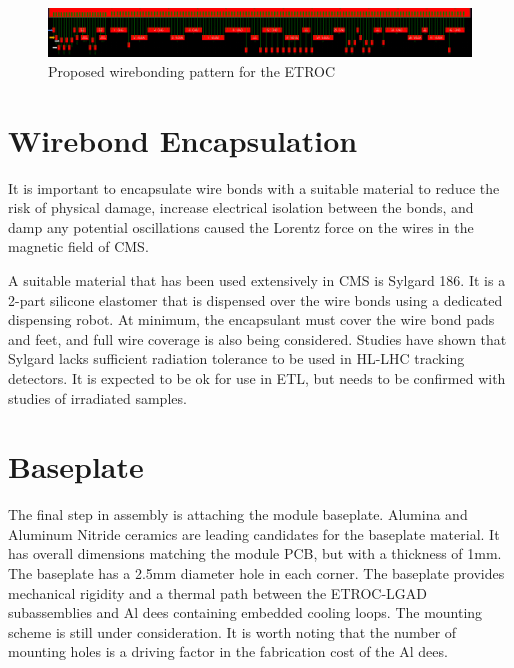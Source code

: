 \documentclass[10pt]{datasheet}
\begin{document}
\begin{figure}[h]
	\centering
	\includegraphics[width=\textwidth]{figures/wirebonding-pattern.png}
	\caption{Proposed wirebonding pattern for the ETROC}
	\label{fig:wirebonding-pattern}	
\end{figure}

\section{Wirebond Encapsulation}

It is important to encapsulate wire bonds with a suitable material to reduce the risk of physical damage, increase electrical isolation between the bonds, and damp any potential oscillations caused the Lorentz force on the wires in the magnetic field of CMS.

A suitable material that has been used extensively in CMS is Sylgard 186. It is a 2-part silicone elastomer that is dispensed over the wire bonds using a dedicated dispensing robot. At minimum, the encapsulant must cover the wire bond pads and feet, and full wire coverage is also being considered.  Studies have shown that Sylgard lacks sufficient radiation tolerance to be used in HL-LHC tracking detectors.  It is expected to be ok for use in ETL, but needs to be confirmed with studies of irradiated samples.

\section{Baseplate}

The final step in assembly is attaching the module baseplate. Alumina and Aluminum Nitride ceramics are leading candidates for the baseplate material. It has overall dimensions matching the module PCB, but with a thickness of 1mm. The baseplate has a 2.5mm diameter hole in each corner.  The baseplate provides mechanical rigidity and a thermal path between the ETROC-LGAD subassemblies and Al dees containing embedded cooling loops.  The mounting scheme is still under consideration.  It is worth noting that the number of mounting holes is a driving factor in the fabrication cost of the Al dees.
\end{document}
